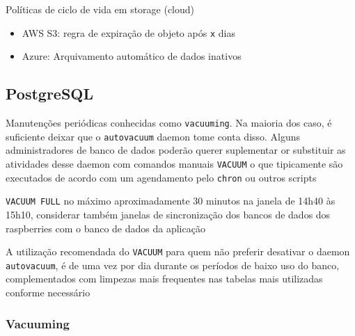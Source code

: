 \documentclass[11pt]{article}
\begin{document}
Políticas de ciclo de vida em storage (cloud)
\begin{itemize}
\item AWS S3: regra de expiração de objeto após \texttt{x} dias
\item Azure: Arquivamento automático de dados inativos
\end{itemize}
\subsection{PostgreSQL}
\label{sec:org1c45d59}

Manutenções periódicas conhecidas como \texttt{vacuuming}. Na maioria dos caso, é suficiente
deixar que o \texttt{autovacuum} daemon tome conta disso. Alguns administradores de banco de dados
poderão querer suplementar or substituir as atividades desse daemon com comandos manuais \texttt{VACUUM}
o que tipicamente são executados de acordo com um agendamento pelo \texttt{chron} ou outros scripts

\texttt{VACUUM FULL} no máximo aproximadamente 30 minutos na janela de 14h40 às 15h10, considerar também janelas
de sincronização dos bancos de dados dos raspberries com o banco de dados da aplicação

A utilização recomendada do \texttt{VACUUM} para quem não preferir desativar o daemon \texttt{autovacuum}, é de uma vez por dia durante
os períodos de baixo uso do banco, complementados com limpezas mais frequentes nas tabelas mais utilizadas conforme necessário
\subsubsection{Vacuuming}
\label{sec:orgdaa3ee1}
\end{document}
